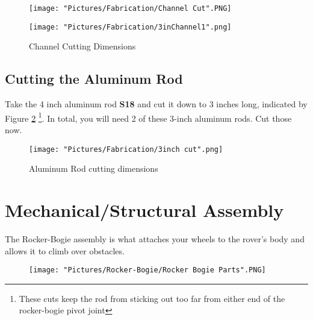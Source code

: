 \documentclass[12pt]{article}
\begin{document}
\begin{figure}[H]
  \centering
  \begin{minipage}[b]{0.45\textwidth}
    \texttt{[image: "Pictures/Fabrication/Channel Cut".PNG]}
  \end{minipage}
  \hfill
  \begin{minipage}[b]{0.45\textwidth}
    \texttt{[image: "Pictures/Fabrication/3inChannel1".png]}
  \end{minipage}
  \caption{Channel Cutting Dimensions}
  \label{channel dimensions}
\end{figure}


\subsection{Cutting the Aluminum Rod}

Take the 4 inch aluminum rod \textbf{S18} and cut it down to 3 inches long, indicated by Figure \ref{rod cut} \footnote{These cuts keep the rod from sticking out too far from either end of the rocker-bogie pivot joint}. In total, you will need 2 of these 3-inch aluminum rods. Cut those now.

\begin{figure}[H]
	\centering
	\texttt{[image: "Pictures/Fabrication/3inch cut".png]}
	\caption{Aluminum Rod cutting dimensions}
	\label{rod cut}
\end{figure}

\section{Mechanical/Structural Assembly}

The Rocker-Bogie assembly is what attaches your wheels to the rover's body and allows it to climb over obstacles.

\begin{figure}[H]
	\centering
	\texttt{[image: "Pictures/Rocker-Bogie/Rocker Bogie Parts".PNG]}
\end{figure}
\end{document}
